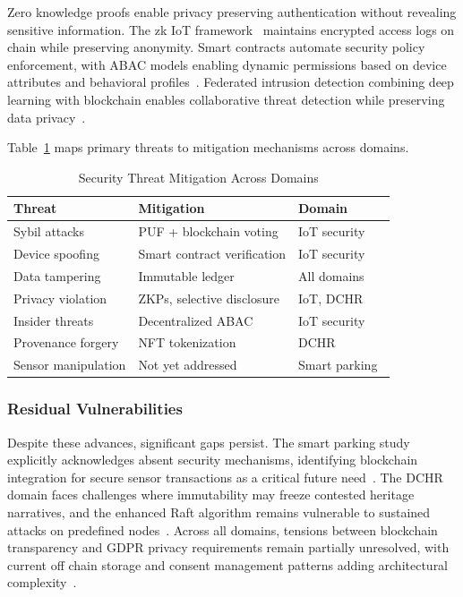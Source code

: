 \documentclass[conference]{IEEEtran}
\begin{document}
Zero knowledge proofs enable privacy preserving authentication without revealing sensitive information. The zk IoT framework~\cite{b19} maintains encrypted access logs on chain while preserving anonymity. Smart contracts automate security policy enforcement, with ABAC models enabling dynamic permissions based on device attributes and behavioral profiles~\cite{b7}. Federated intrusion detection combining deep learning with blockchain enables collaborative threat detection while preserving data privacy~\cite{b15}.

Table~\ref{tab:security} maps primary threats to mitigation mechanisms across domains.

\begin{table}[htbp]
\caption{Security Threat Mitigation Across Domains}
\begin{center}
\begin{tabular}{p{1.8cm}p{2.5cm}p{3cm}}
\toprule
\textbf{Threat} & \textbf{Mitigation} & \textbf{Domain} \\
\midrule
Sybil attacks & PUF + blockchain voting & IoT security~\cite{b4,b5} \\
\midrule
Device spoofing & Smart contract verification & IoT security~\cite{b4} \\
\midrule
Data tampering & Immutable ledger & All domains~\cite{b1,b2} \\
\midrule
Privacy violation & ZKPs, selective disclosure & IoT, DCHR~\cite{b19,b2} \\
\midrule
Insider threats & Decentralized ABAC & IoT security~\cite{b7} \\
\midrule
Provenance forgery & NFT tokenization & DCHR~\cite{b2,b17} \\
\midrule
Sensor manipulation & Not yet addressed & Smart parking~\cite{b3} \\
\bottomrule
\end{tabular}
\label{tab:security}
\end{center}
\end{table}

\subsubsection{Residual Vulnerabilities}

Despite these advances, significant gaps persist. The smart parking study explicitly acknowledges absent security mechanisms, identifying blockchain integration for secure sensor transactions as a critical future need~\cite{b3}. The DCHR domain faces challenges where immutability may freeze contested heritage narratives, and the enhanced Raft algorithm remains vulnerable to sustained attacks on predefined nodes~\cite{b2}. Across all domains, tensions between blockchain transparency and GDPR privacy requirements remain partially unresolved, with current off chain storage and consent management patterns adding architectural complexity~\cite{b1,b18}.
\end{document}
